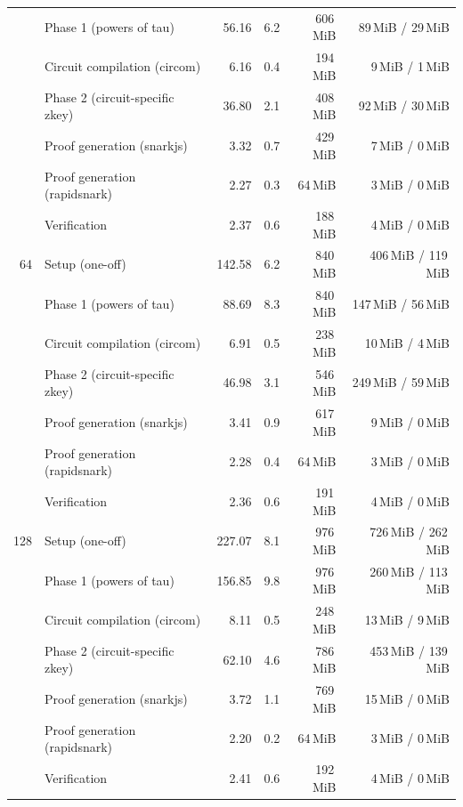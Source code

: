 \begin{table}[t]
{\begin{tabular}{|r|l|r|r|r|r|}
 & \quad Phase 1 (powers of tau) & 56.16 & 6.2 & 606\,MiB & 89\,MiB / 29\,MiB \\
 & \quad Circuit compilation (circom) & 6.16 & 0.4 & 194\,MiB & 9\,MiB / 1\,MiB \\
 & \quad Phase 2 (circuit-specific zkey) & 36.80 & 2.1 & 408\,MiB & 92\,MiB / 30\,MiB \\
 & Proof generation (snarkjs) & 3.32 & 0.7 & 429\,MiB & 7\,MiB / 0\,MiB \\
 & Proof generation (rapidsnark) & 2.27 & 0.3 & 64\,MiB & 3\,MiB / 0\,MiB \\
 & Verification & 2.37 & 0.6 & 188\,MiB & 4\,MiB / 0\,MiB \\
\hline
64 & Setup (one-off) & 142.58 & 6.2 & 840\,MiB & 406\,MiB / 119\,MiB \\
 & \quad Phase 1 (powers of tau) & 88.69 & 8.3 & 840\,MiB & 147\,MiB / 56\,MiB \\
 & \quad Circuit compilation (circom) & 6.91 & 0.5 & 238\,MiB & 10\,MiB / 4\,MiB \\
 & \quad Phase 2 (circuit-specific zkey) & 46.98 & 3.1 & 546\,MiB & 249\,MiB / 59\,MiB \\
 & Proof generation (snarkjs) & 3.41 & 0.9 & 617\,MiB & 9\,MiB / 0\,MiB \\
 & Proof generation (rapidsnark) & 2.28 & 0.4 & 64\,MiB & 3\,MiB / 0\,MiB \\
 & Verification & 2.36 & 0.6 & 191\,MiB & 4\,MiB / 0\,MiB \\
\hline
128 & Setup (one-off) & 227.07 & 8.1 & 976\,MiB & 726\,MiB / 262\,MiB \\
 & \quad Phase 1 (powers of tau) & 156.85 & 9.8 & 976\,MiB & 260\,MiB / 113\,MiB \\
 & \quad Circuit compilation (circom) & 8.11 & 0.5 & 248\,MiB & 13\,MiB / 9\,MiB \\
 & \quad Phase 2 (circuit-specific zkey) & 62.10 & 4.6 & 786\,MiB & 453\,MiB / 139\,MiB \\
 & Proof generation (snarkjs) & 3.72 & 1.1 & 769\,MiB & 15\,MiB / 0\,MiB \\
 & Proof generation (rapidsnark) & 2.20 & 0.2 & 64\,MiB & 3\,MiB / 0\,MiB \\
 & Verification & 2.41 & 0.6 & 192\,MiB & 4\,MiB / 0\,MiB \\
\hline
\end{tabular}}
\end{table}
